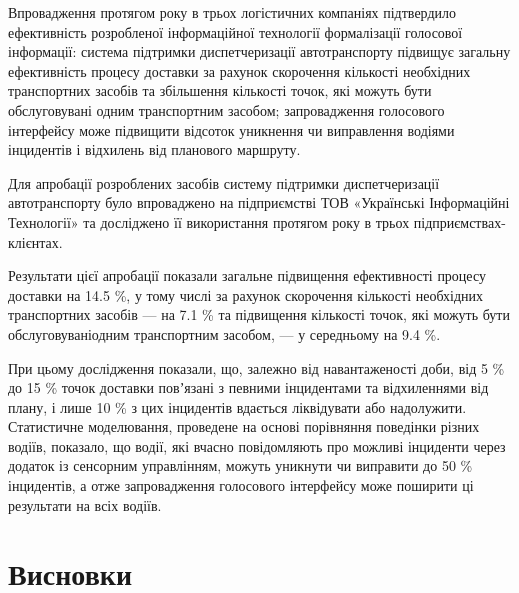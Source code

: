 Впровадження протягом року в трьох логістичних компаніях підтвердило ефективність розробленої інформаційної технології формалізації голосової інформації: система підтримки диспетчеризації автотранспорту підвищує загальну ефективність процесу доставки за рахунок скорочення кількості необхідних транспортних засобів та збільшення кількості точок, які можуть бути обслуговувані одним транспортним засобом; запровадження голосового інтерфейсу може підвищити відсоток уникнення чи виправлення водіями інцидентів і відхилень від планового маршруту.

Для апробації розроблених засобів систему підтримки диспетчеризації автотранспорту було впроваджено на підприємстві ТОВ «Українські Інформаційні Технології» та досліджено її використання протягом року в трьох підприємствах-клієнтах.

Результати цієї апробації показали загальне підвищення ефективності процесу доставки на 14.5 \%, у тому числі за рахунок скорочення кількості необхідних транспортних засобів --- на 7.1 \% та підвищення кількості точок, які можуть бути обслуговуваніодним транспортним засобом, --- у середньому на 9.4 \%.


При цьому дослідження показали, що, залежно від навантаженості доби, від 5 \% до 15 \% точок доставки повʼязані з певними інцидентами та відхиленнями від плану, і лише 10 \% з цих інцидентів вдається ліквідувати або надолужити. Статистичне моделювання, проведене на основі порівняння поведінки різних водіїв, показало, що водії, які вчасно повідомляють про можливі інциденти через додаток із сенсорним управлінням, можуть уникнути чи виправити до 50 \% інцидентів, а отже запровадження голосового інтерфейсу може поширити ці результати на всіх водіїв.

\section*{Висновки}





